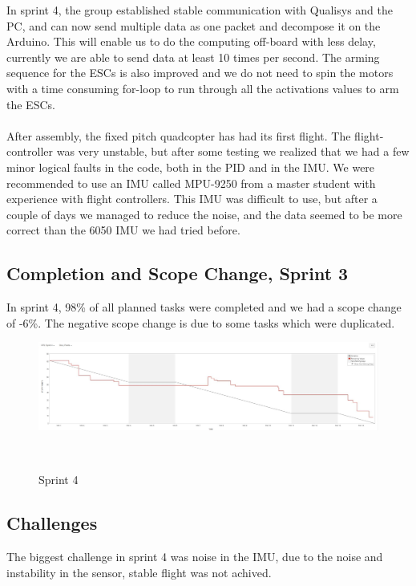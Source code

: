 In sprint 4, the group established stable communication with Qualisys and the PC, and can now send multiple data as one packet and decompose it on the Arduino. This will enable us to do the computing off-board with less delay, currently we are able to send data at least 10 times per
second. The arming sequence for the ESCs is also improved and we do not need to spin the motors with
a time consuming for-loop to run through all the activations values to arm the ESCs. \\
\\
After assembly, the fixed pitch quadcopter has had its first flight. The flight-controller was very unstable, but after some testing we realized that we had a few minor logical faults in the code, both in the PID and in the IMU. We were recommended to use an IMU called MPU-9250 from a master student with experience with flight controllers. This IMU was difficult to use, but after a couple of days we managed to reduce the noise, and the data seemed to be more correct than the 6050 IMU we had tried before.
\\
\subsection{Completion and Scope Change, Sprint 3}

In sprint 4, 98\% of all planned tasks were completed and we had a scope change of -6\%. The negative scope change is due to some tasks which were duplicated.


\begin{figure}[h]
        \centering
        \includegraphics[width = 1\textwidth]{VAPIQ-PICTURES/BDSprint4}
        \caption{Sprint 4}
        \\[2.0 cm]
    \end{figure} 


\subsection{Challenges}

The biggest challenge in sprint 4 was noise in the IMU, due to the noise and instability in the sensor, stable flight was not achived.

